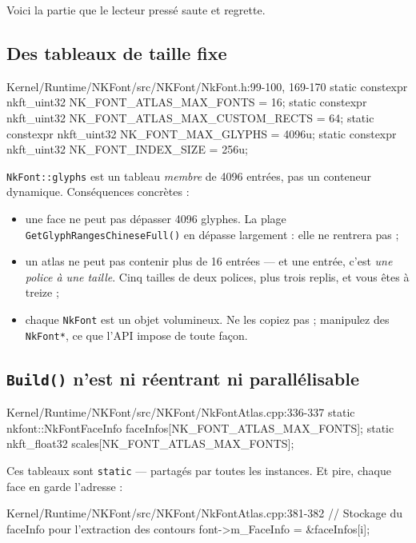 Voici la partie que le lecteur pressé saute et regrette.

\subsection{Des tableaux de taille fixe}

\begin{nkcode}{Kernel/Runtime/NKFont/src/NKFont/NkFont.h:99-100, 169-170}
static constexpr nkft_uint32 NK_FONT_ATLAS_MAX_FONTS = 16;
static constexpr nkft_uint32 NK_FONT_ATLAS_MAX_CUSTOM_RECTS = 64;
static constexpr nkft_uint32 NK_FONT_MAX_GLYPHS = 4096u;
static constexpr nkft_uint32 NK_FONT_INDEX_SIZE = 256u;
\end{nkcode}

\texttt{NkFont::glyphs} est un tableau \emph{membre} de 4096 entrées, pas un
conteneur dynamique. Conséquences concrètes :

\begin{itemize}
  \item une face ne peut pas dépasser 4096 glyphes. La plage
        \texttt{GetGlyphRangesChineseFull()} en dépasse largement : elle ne
        rentrera pas ;
  \item un atlas ne peut pas contenir plus de 16 entrées — et une entrée, c'est
        \emph{une police à une taille}. Cinq tailles de deux polices, plus trois
        replis, et vous êtes à treize ;
  \item chaque \texttt{NkFont} est un objet volumineux. Ne les copiez pas ;
        manipulez des \texttt{NkFont*}, ce que l'API impose de toute façon.
\end{itemize}

\subsection{\texttt{Build()} n'est ni réentrant ni parallélisable}

\begin{nkcode}{Kernel/Runtime/NKFont/src/NKFont/NkFontAtlas.cpp:336-337}
        static nkfont::NkFontFaceInfo faceInfos[NK_FONT_ATLAS_MAX_FONTS];
        static nkft_float32 scales[NK_FONT_ATLAS_MAX_FONTS];
\end{nkcode}

Ces tableaux sont \texttt{static} — partagés par toutes les instances. Et pire,
chaque face en garde l'adresse :

\begin{nkcode}{Kernel/Runtime/NKFont/src/NKFont/NkFontAtlas.cpp:381-382}
                // Stockage du faceInfo pour l'extraction des contours
                font->m_FaceInfo = &faceInfos[i];
\end{nkcode}

